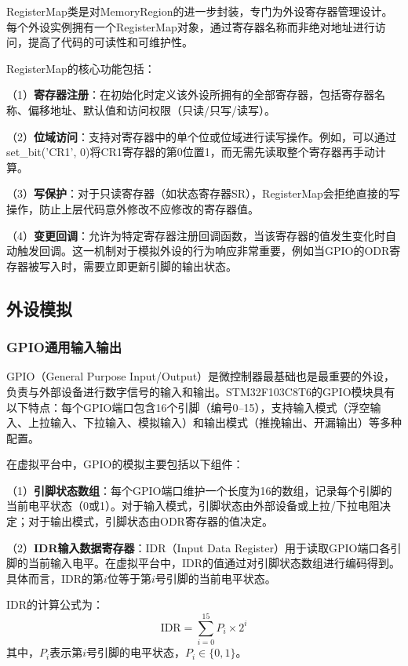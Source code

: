 \documentclass[12pt,a4paper]{ctexart}
\begin{document}
RegisterMap类是对MemoryRegion的进一步封装，专门为外设寄存器管理设计。每个外设实例拥有一个RegisterMap对象，通过寄存器名称而非绝对地址进行访问，提高了代码的可读性和可维护性。

RegisterMap的核心功能包括：

（1）\textbf{寄存器注册}：在初始化时定义该外设所拥有的全部寄存器，包括寄存器名称、偏移地址、默认值和访问权限（只读/只写/读写）。

（2）\textbf{位域访问}：支持对寄存器中的单个位或位域进行读写操作。例如，可以通过set\_bit('CR1', 0)将CR1寄存器的第0位置1，而无需先读取整个寄存器再手动计算。

（3）\textbf{写保护}：对于只读寄存器（如状态寄存器SR），RegisterMap会拒绝直接的写操作，防止上层代码意外修改不应修改的寄存器值。

（4）\textbf{变更回调}：允许为特定寄存器注册回调函数，当该寄存器的值发生变化时自动触发回调。这一机制对于模拟外设的行为响应非常重要，例如当GPIO的ODR寄存器被写入时，需要立即更新引脚的输出状态。

\subsection{外设模拟}

\subsubsection{GPIO通用输入输出}

GPIO（General Purpose Input/Output）是微控制器最基础也是最重要的外设，负责与外部设备进行数字信号的输入和输出。STM32F103C8T6的GPIO模块具有以下特点：每个GPIO端口包含16个引脚（编号0--15），支持输入模式（浮空输入、上拉输入、下拉输入、模拟输入）和输出模式（推挽输出、开漏输出）等多种配置。

在虚拟平台中，GPIO的模拟主要包括以下组件：

（1）\textbf{引脚状态数组}：每个GPIO端口维护一个长度为16的数组，记录每个引脚的当前电平状态（0或1）。对于输入模式，引脚状态由外部设备或上拉/下拉电阻决定；对于输出模式，引脚状态由ODR寄存器的值决定。

（2）\textbf{IDR输入数据寄存器}：IDR（Input Data Register）用于读取GPIO端口各引脚的当前输入电平。在虚拟平台中，IDR的值通过对引脚状态数组进行编码得到。具体而言，IDR的第$i$位等于第$i$号引脚的当前电平状态。

IDR的计算公式为：
\begin{equation}
    \text{IDR} = \sum_{i=0}^{15} P_i \times 2^i
\end{equation}
其中，$P_i$表示第$i$号引脚的电平状态，$P_i \in \{0, 1\}$。
\end{document}
